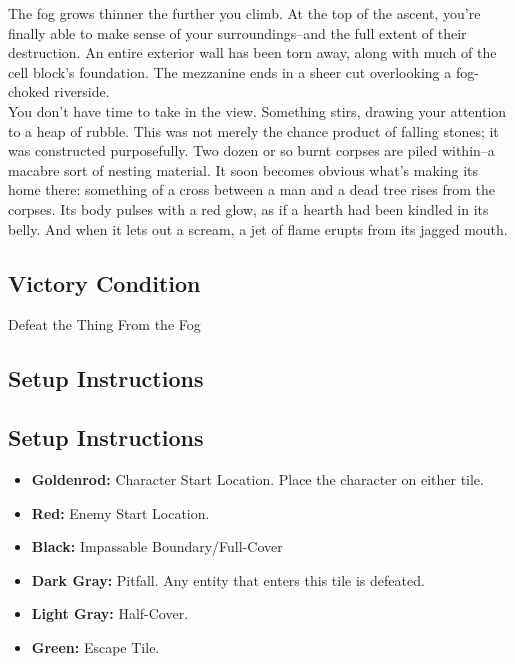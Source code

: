 The fog grows thinner the further you climb. At the top of the ascent, you’re finally able to make sense of your surroundings--and the full extent of their destruction. An entire exterior wall has been torn away, along with much of the cell block’s foundation. The mezzanine ends in a sheer cut overlooking a fog-choked riverside.\\
You don’t have time to take in the view. Something stirs, drawing your attention to a heap of rubble. This was not merely the chance product of falling stones; it was constructed purposefully. 
Two dozen or so burnt corpses are piled within--a macabre sort of nesting material. It soon becomes obvious what’s making its home there: something of a cross between a man and a dead tree rises from the corpses. Its body pulses with a red glow, as if a hearth had been kindled in its belly. And when it lets out a scream, a jet of flame erupts from its jagged mouth.

\subsection*{Victory Condition}
Defeat the Thing From the Fog

\subsection*{Setup Instructions}
\begin{center}
\end{center}

\subsection*{Setup Instructions}
\begin{itemize}
\item \textbf{Goldenrod:} Character Start Location. Place the character on either tile.
\item \textbf{Red:} Enemy Start Location.
\item \textbf{Black:} Impassable Boundary/Full-Cover
\item \textbf{Dark Gray:} Pitfall. Any entity that enters this tile is defeated.
\item \textbf{Light Gray:} Half-Cover.
\item \textbf{Green:} Escape Tile.
\end{itemize}

